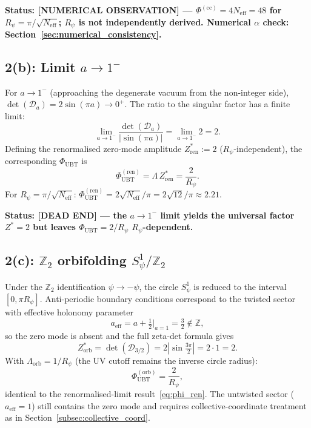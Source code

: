 \documentclass[11pt,a4paper]{article}
\theoremstyle{definition}
\theoremstyle{remark}
\begin{document}
\medskip
\textbf{Status: \textbf{[NUMERICAL OBSERVATION]} ---
$\Phi^{(\mathrm{cc})} = 4N_{\mathrm{eff}} = 48$ for
$R_\psi = \pi/\sqrt{N_{\mathrm{eff}}}$;
$R_\psi$ is not independently derived.
Numerical $\alpha$ check: Section~\ref{sec:numerical_consistency}.}

\subsection{2(b): Limit $a \to 1^-$}
\label{subsec:lim_a1}

For $a \to 1^-$ (approaching the degenerate vacuum from the non-integer
side), $\det(\mathcal{D}_a) = 2\sin(\pi a) \to 0^+$.
The ratio to the singular factor has a finite limit:
\begin{equation}
  \lim_{a\to 1^-}
  \frac{\det(\mathcal{D}_a)}{|\sin(\pi a)|}
  = \lim_{a\to 1^-} 2 = 2.
  \label{eq:ratio_limit}
\end{equation}
Defining the renormalised zero-mode amplitude
$Z^*_{\mathrm{ren}} := 2$ ($R_\psi$-independent),
the corresponding $\Phi_{\mathrm{UBT}}$ is
\begin{equation}
  \Phi_{\mathrm{UBT}}^{(\mathrm{ren})}
  = \Lambda\,Z^*_{\mathrm{ren}}
  = \frac{2}{R_\psi}.
  \label{eq:phi_ren}
\end{equation}
For $R_\psi = \pi/\sqrt{N_{\mathrm{eff}}}$:
$\Phi_{\mathrm{UBT}}^{(\mathrm{ren})} = 2\sqrt{N_{\mathrm{eff}}}/\pi
= 2\sqrt{12}/\pi \approx 2.21$.

\medskip
\textbf{Status: \textbf{[DEAD END]} ---
the $a \to 1^-$ limit yields the universal factor $Z^* = 2$
but leaves $\Phi_{\mathrm{UBT}} = 2/R_\psi$ $R_\psi$-dependent.}

\subsection{2(c): $\mathbb{Z}_2$ orbifolding $S^1_\psi/\mathbb{Z}_2$}
\label{subsec:orbifold}

Under the $\mathbb{Z}_2$ identification $\psi \to -\psi$, the circle
$S^1_\psi$ is reduced to the interval $[0,\pi R_\psi]$.
Anti-periodic boundary conditions correspond to the twisted sector with
effective holonomy parameter
\begin{equation}
  a_{\mathrm{eff}} = a + \tfrac{1}{2}
  \big|_{a=1}
  = \tfrac{3}{2} \notin \mathbb{Z},
  \label{eq:a_eff}
\end{equation}
so the zero mode is absent and the full zeta-det formula gives
\begin{equation}
  Z^*_{\mathrm{orb}}
  = \det\!\left(\mathcal{D}_{3/2}\right)
  = 2\left|\sin\!\tfrac{3\pi}{2}\right|
  = 2\cdot 1 = 2.
  \label{eq:Zorb}
\end{equation}
With $\Lambda_{\mathrm{orb}} = 1/R_\psi$ (the UV cutoff remains
the inverse circle radius):
\begin{equation}
  \Phi_{\mathrm{UBT}}^{(\mathrm{orb})}
  = \frac{2}{R_\psi},
  \label{eq:phi_orb}
\end{equation}
identical to the renormalised-limit result~\eqref{eq:phi_ren}.
The untwisted sector ($a_{\mathrm{eff}} = 1$) still contains the zero
mode and requires collective-coordinate treatment as in
Section~\ref{subsec:collective_coord}.
\end{document}
